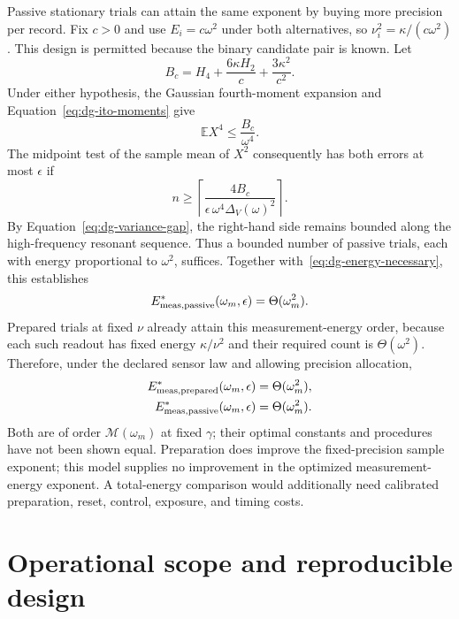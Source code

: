 Passive stationary trials can attain the same exponent by buying more
precision per record. Fix $c>0$ and use
$E_i=c\omega^2$ under both alternatives, so
$\nu_i^2=\kappa/(c\omega^2)$. This design is permitted because the
binary candidate pair is known. Let
\begin{equation}
 B_c=H_4+\frac{6\kappa H_2}{c}
             +\frac{3\kappa^2}{c^2}.
 \label{eq:dg-energy-fourth-constant}
\end{equation}
Under either hypothesis, the Gaussian fourth-moment expansion and
Equation~\eqref{eq:dg-ito-moments} give
\[
 \mathbb E X^4\leq\frac{B_c}{\omega^4}.
\]
The midpoint test of the sample mean of $X^2$ consequently has both errors
at most $\epsilon$ if
\begin{equation}
 n\geq
 \left\lceil\frac{4B_c}
       {\epsilon\,\omega^4\Delta_V(\omega)^2}\right\rceil.
 \label{eq:dg-energy-passive-sufficient}
\end{equation}
By Equation~\eqref{eq:dg-variance-gap}, the right-hand side remains
bounded along the high-frequency resonant sequence. Thus a bounded number
of passive trials, each with energy proportional to $\omega^2$, suffices.
Together with~\eqref{eq:dg-energy-necessary}, this establishes
\begin{equation}
 E^*_{\rm meas,passive}(\omega_m,\epsilon)=\Theta(\omega_m^2).
 \label{eq:dg-passive-energy-rate}
\end{equation}
Prepared trials at fixed $\nu$ already attain this measurement-energy
order, because each such readout has fixed energy $\kappa/\nu^2$ and
their required count is $\Theta(\omega^2)$. Therefore, under the declared
sensor law and allowing precision allocation,
\begin{equation}
 \begin{aligned}
 E^*_{\rm meas,prepared}(\omega_m,\epsilon)
   &=\Theta(\omega_m^2),\\
 E^*_{\rm meas,passive}(\omega_m,\epsilon)
   &=\Theta(\omega_m^2).
 \end{aligned}
 \label{eq:dg-energy-comparison}
\end{equation}
Both are of order $\mathcal M(\omega_m)$ at fixed $\gamma$; their optimal
constants and procedures have not been shown equal. Preparation does improve the fixed-precision
sample exponent; this model supplies no improvement in the optimized
measurement-energy exponent. A total-energy comparison would additionally
need calibrated preparation, reset, control, exposure, and timing costs.

\section{Operational scope and reproducible design}


